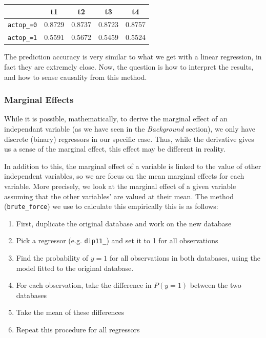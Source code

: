 \begin{center}
    \begin{tabular}{lcccc}
        \hline
                           & t1     & t2     & t3     & t4     \\
        \hline
        \texttt{actop\_=0} & 0.8729 & 0.8737 & 0.8723 & 0.8757 \\
        \texttt{actop\_=1} & 0.5591 & 0.5672 & 0.5459 & 0.5524 \\
    \end{tabular}
\end{center}

The prediction accuracy is very similar to what we get with a linear regression, in fact they are extremely close. Now, the question is how to interpret the results, and how to sense causality from this method.

\subsubsection{Marginal Effects}
While it is possible, mathematically, to derive the marginal effect of an independant variable (as we have seen in the \textit{Background} section), we only have discrete (binary) regressors in our specific case. Thus, while the derivative gives us a sense of the marginal effect, this effect may be different in reality.

In addition to this, the marginal effect of a variable is linked to the value of other independent variables, so we are focus on the mean marginal effects for each variable. More precisely, we look at the marginal effect of a given variable assuming that the other variables' are valued at their mean. The method (\texttt{brute\_force}) we use to calculate this empirically this is as follows:

\begin{enumerate}
    \item First, duplicate the original database and work on the new database
    \item Pick a regressor (e.g. \texttt{dip11\_}) and set it to 1 for all observations
    \item Find the probability of $y=1$ for all observations in both databases, using the model fitted to the original database.
    \item For each observation, take the difference in $P(y=1)$ between the two databases
    \item Take the mean of these differences
    \item Repeat this procedure for all regressors
\end{enumerate}

